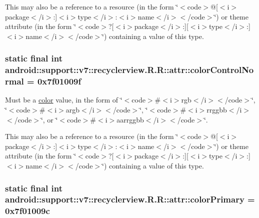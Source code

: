 This may also be a reference to a resource (in the form \char`\"{}$<$code$>$@\mbox{[}$<$i$>$package$<$/i$>$:\mbox{]}$<$i$>$type$<$/i$>$:$<$i$>$name$<$/i$>$$<$/code$>$\char`\"{}) or theme attribute (in the form \char`\"{}$<$code$>$?\mbox{[}$<$i$>$package$<$/i$>$:\mbox{]}\mbox{[}$<$i$>$type$<$/i$>$:\mbox{]}$<$i$>$name$<$/i$>$$<$/code$>$\char`\"{}) containing a value of this type. \hypertarget{classandroid_1_1support_1_1v7_1_1recyclerview_1_1_r_1_1attr_aed60a50a54eca1baadd50b791dba6fb}{
\subsubsection[{colorControlNormal}]{\setlength{\rightskip}{0pt plus 5cm}static final int android::support::v7::recyclerview.R.R::attr::colorControlNormal = 0x7f01009f}}
\label{classandroid_1_1support_1_1v7_1_1recyclerview_1_1_r_1_1attr_aed60a50a54eca1baadd50b791dba6fb}


Must be a \hyperlink{classandroid_1_1support_1_1v7_1_1recyclerview_1_1_r_1_1color}{color} value, in the form of \char`\"{}$<$code$>$\#$<$i$>$rgb$<$/i$>$$<$/code$>$\char`\"{}, \char`\"{}$<$code$>$\#$<$i$>$argb$<$/i$>$$<$/code$>$\char`\"{}, \char`\"{}$<$code$>$\#$<$i$>$rrggbb$<$/i$>$$<$/code$>$\char`\"{}, or \char`\"{}$<$code$>$\#$<$i$>$aarrggbb$<$/i$>$$<$/code$>$\char`\"{}. 

This may also be a reference to a resource (in the form \char`\"{}$<$code$>$@\mbox{[}$<$i$>$package$<$/i$>$:\mbox{]}$<$i$>$type$<$/i$>$:$<$i$>$name$<$/i$>$$<$/code$>$\char`\"{}) or theme attribute (in the form \char`\"{}$<$code$>$?\mbox{[}$<$i$>$package$<$/i$>$:\mbox{]}\mbox{[}$<$i$>$type$<$/i$>$:\mbox{]}$<$i$>$name$<$/i$>$$<$/code$>$\char`\"{}) containing a value of this type. \hypertarget{classandroid_1_1support_1_1v7_1_1recyclerview_1_1_r_1_1attr_92ff67f28d175b1d2cefcdad2a8cf000}{
\subsubsection[{colorPrimary}]{\setlength{\rightskip}{0pt plus 5cm}static final int android::support::v7::recyclerview.R.R::attr::colorPrimary = 0x7f01009c}}
\label{classandroid_1_1support_1_1v7_1_1recyclerview_1_1_r_1_1attr_92ff67f28d175b1d2cefcdad2a8cf000}


